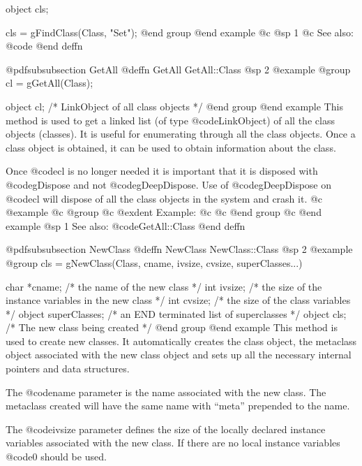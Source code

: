 object  cls;

cls = gFindClass(Class, "Set");
@end group
@end example
@c @sp 1
@c See also:  @code{}
@end deffn







@pdfsubsubsection {GetAll}
@deffn {GetAll} GetAll::Class
@sp 2
@example
@group
cl = gGetAll(Class);

object  cl;     /*  LinkObject of all class objects  */
@end group
@end example
This method is used to get a linked list (of type @code{LinkObject})
of all the class objects (classes).  It is useful for enumerating through
all the class objects.  Once a class object is obtained, it
can be used to obtain information about the class.

Once @code{cl} is no longer needed it is important that it is
disposed with @code{gDispose} and not @code{gDeepDispose}.  Use
of @code{gDeepDispose} on @code{cl} will dispose of all the class
objects in the system and crash it.
@c @example
@c @group
@c @exdent Example:
@c 
@c @end group
@c @end example
@sp 1
See also:  @code{GetAll::Class}
@end deffn









@pdfsubsubsection {NewClass}
@deffn {NewClass} NewClass::Class
@sp 2
@example
@group
cls = gNewClass(Class, cname, ivsize, cvsize, superClasses...)

char    *cname; /*  the name of the new class    */
int     ivsize; /*  the size of the instance variables in 
                    the new class  */
int     cvsize; /*  the size of the class variables  */
object  superClasses;  /*  an END terminated list of 
                           superclasses  */
object  cls;    /*  The new class being created  */
@end group
@end example
This method is used to create new classes.  It automatically creates the
class object, the metaclass object associated with the new class object
and sets up all the necessary internal pointers and data structures.

The @code{name} parameter is the name associated with the new class.
The metaclass created will have the same name with ``meta'' prepended
to the name.  

The @code{ivsize} parameter defines the size of the locally
declared instance variables associated with the new class.  If there are
no local instance variables @code{0} should be used.  

